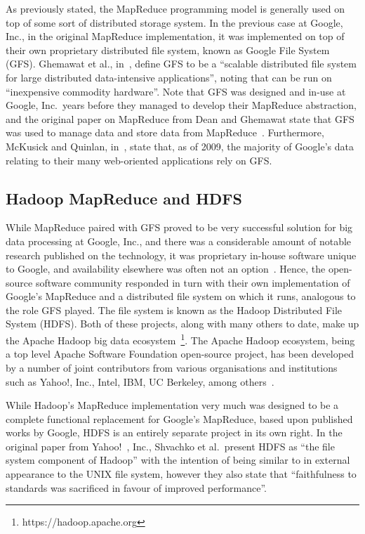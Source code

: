 As previously stated, the MapReduce programming model is generally used on top of some sort of distributed storage
system. In the previous case at Google, Inc., in the original MapReduce implementation, it was implemented on top of
their own proprietary distributed file system, known as Google File System (GFS). Ghemawat et al.,
in~\cite{ghemawat_google_2003}, define GFS to be a ``scalable distributed file system for large distributed data-intensive
applications'', noting that can be run on ``inexpensive commodity hardware''. Note that GFS was designed and in-use
at Google, Inc.\ years before they managed to develop their MapReduce abstraction, and the original paper on MapReduce
from Dean and Ghemawat state that GFS was used to manage data and store data from MapReduce~\cite{dean_mapreduce:_2008}.
Furthermore, McKusick and Quinlan, in~\cite{mckusick2009gfs}, state that, as of 2009, the majority of Google's data
relating to their many web-oriented applications rely on GFS.



\subsection{Hadoop MapReduce and HDFS} %
\label{ssub:hadoop_mapreduce_and_hdfs}

While MapReduce paired with GFS proved to be very successful solution for big data processing at Google, Inc., and
there was a considerable amount of notable research published on the technology, it was proprietary in-house software
unique to Google, and availability elsewhere was often not an option~\cite{grossman2009varieties}. Hence, the
open-source software community responded in turn with their own implementation of Google's MapReduce and a
distributed file system on which it runs,
analogous to the role GFS played. The file system is known as the Hadoop Distributed File System (HDFS). Both of these
projects, along with many others to date, make up the Apache Hadoop
big data ecosystem~\footnote{https://hadoop.apache.org}. The Apache Hadoop ecosystem, being a top level Apache Software
Foundation open-source project, has been developed by a number of joint contributors from various organisations and
institutions such as Yahoo!, Inc., Intel, IBM, UC Berkeley, among others~\cite{hadoop_committers}.

While Hadoop's MapReduce implementation very much was designed to be a complete functional replacement for Google's MapReduce, based upon published works by Google,
HDFS is an entirely separate project in its own right. In the original paper from Yahoo!~\cite{shvachko2010hadoop},
Inc., Shvachko et al.\ present HDFS as ``the file system component of Hadoop'' with the intention of being similar to
in external appearance to the UNIX file system, however they also state that ``faithfulness to standards was sacrificed
in favour of improved performance''.

